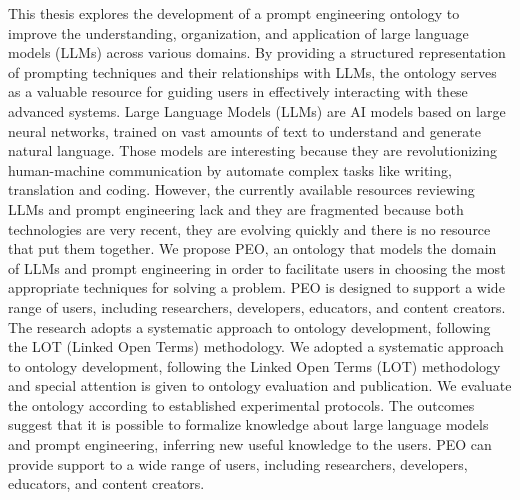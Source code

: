 This thesis explores the development of a prompt engineering ontology to improve the understanding, organization, and application of large language models (LLMs) across various domains. By providing a structured representation of prompting techniques and their relationships with LLMs, the ontology serves as a valuable resource for guiding users in effectively interacting with these advanced systems.
Large Language Models (LLMs) are AI models based on large neural networks, trained on vast amounts of text to understand and generate natural language. Those models are interesting because they are revolutionizing human-machine communication by automate complex tasks like writing, translation and coding.
However, the currently available resources reviewing LLMs and prompt engineering lack and they are fragmented because both technologies are very recent, they are evolving quickly and there is no resource that  put them together.
We propose PEO, an ontology that models the domain of LLMs and prompt engineering in order to facilitate users in choosing the most appropriate techniques for solving a problem. PEO is designed to support a wide range of users, including researchers, developers, educators, and content creators. The research adopts a systematic approach to ontology development, following the LOT (Linked Open Terms) methodology.
We adopted a systematic approach to ontology development, following the Linked Open Terms (LOT) methodology and special attention is given to ontology evaluation and publication. We evaluate the ontology according to established experimental protocols.
The outcomes suggest that it is possible to formalize knowledge about large language models and prompt engineering, inferring new useful knowledge to the users.
PEO can provide support to a wide range of users, including researchers, developers, educators, and content creators.